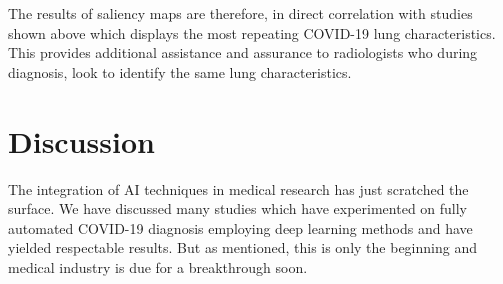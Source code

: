 \vspace{-2em}



The results of saliency maps are therefore, in direct 
correlation with studies shown above which displays 
the most repeating COVID-19 lung characteristics. This provides 
additional assistance and assurance to radiologists who during 
diagnosis, look to identify the same lung characteristics.

\section{Discussion}
The integration of AI techniques in medical research has 
just scratched the surface. We have discussed many studies 
which have experimented on fully automated COVID-19 
diagnosis employing deep learning methods and have 
yielded respectable results. But as mentioned, this is 
only the beginning and medical industry is due for a 
breakthrough soon. 


